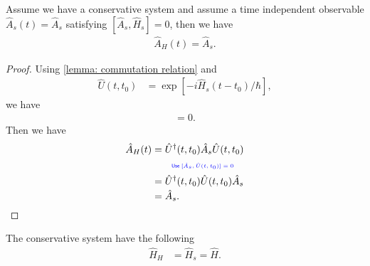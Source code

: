 \documentclass[../../note.tex]{subfiles}
\begin{document}
\begin{lemma}
    Assume we have a conservative system and assume a time independent observable $\hat{A}_s(t) = \hat{A}_s$ satisfying $[\hat{A}_s, \hat{H}_s] = 0$, then we have
    \begin{align}
        \hat{A}_H(t) = \hat{A}_s.
    \end{align}
\end{lemma}
\begin{proof}
    Using \ref{lemma: commutation relation} and 
    \begin{align}
        \hat{U}(t,t_0)
        &= \exp\left[-i \hat{H}_s (t-t_0) /\hbar\right],
    \end{align}
    we have
    \begin{align}
        [\hat{A}_s, \hat{U}(t,t_0)] = 0.
    \end{align}
    Then we have
    \begin{align}
        \hat{A}_H(t)
        &= \hat{U}^\dagger(t,t_0) \hat{A}_s \hat{U}(t,t_0) \\
        &\qquad\text{\color{blue}{\tiny\sffamily Use $[\hat{A}_s, \hat{U}(t,t_0)] = 0$}} \nonumber \\
        &= \hat{U}^\dagger(t,t_0) \hat{U}(t,t_0) \hat{A}_s \\
        &= \hat{A}_s.
    \end{align}
\end{proof}

\begin{corollary}
    The conservative system have the following
    \begin{align}
        \hat{H}_H
        &= \hat{H}_s = \hat{H}.
    \end{align}
\end{corollary}
\end{document}

